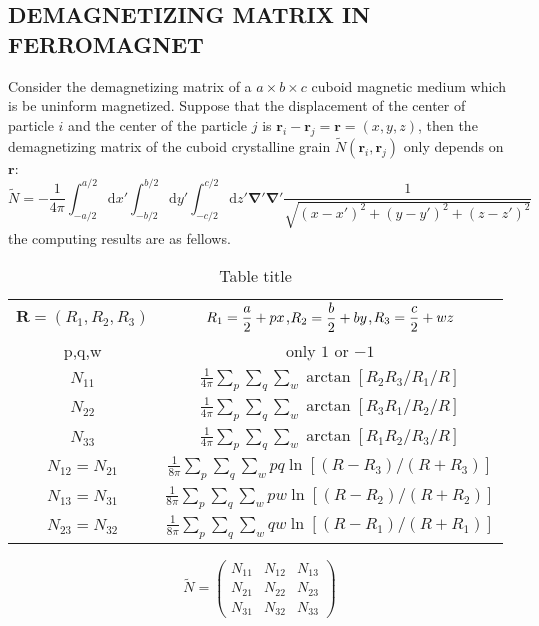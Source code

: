 \documentclass{article}
\begin{document}
\subsection{DEMAGNETIZING MATRIX IN FERROMAGNET}
Consider the demagnetizing matrix of a $a\times b\times c$ cuboid magnetic medium which is be uninform magnetized. Suppose that the displacement of the center of particle $i$ and the center of the particle $j$ is $\bm{r}_i-\bm{r}_j=\bm{r}=\left(x,y,z\right)$, then the demagnetizing matrix of the cuboid crystalline grain $\tilde{N}\left(\bm{r}_i,\bm{r}_j\right)$ only depends on $\bm{r}$: 
\begin{equation}
\tilde{N}=-\frac{1}{4\pi} \int_{-a/2}^{a/2}\mathrm{d}x'\int_{-b/2}^{b/2}\mathrm{d}y'\int_{-c/2}^{c/2}\mathrm{d}z'\bm{\nabla}'\bm{\nabla}'\frac{1}{\sqrt{\left(x-x'\right)^2+\left(y-y'\right)^2+\left(z-z'\right)^2}}\label{eq18}
\end{equation}
the computing results are as fellows.
\begin{table}[h]
	\centering
	\caption{Table title}
\begin{tabular}{cc}
	\hline $\bm{R}=\left(R_1,R_2,R_3\right)$ & $\displaystyle R_1={a\over 2}+px$,$\displaystyle R_2={b\over 2}+by$,$\displaystyle R_3={c\over 2}+wz$ \\ 
	p,q,w & only $1$ or $-1$ \\
	\hline
$N_{11}$ & $\displaystyle\frac{1}{4\pi}\sum_{p}\sum_{q}\sum_{w}\arctan\left[R_2R_3/R_1/R\right]$ \\ 
$N_{22}$ & $\displaystyle\frac{1}{4\pi}\sum_{p}\sum_{q}\sum_{w}\arctan\left[R_3R_1/R_2/R\right]$ \\ 
$N_{33}$ & $\displaystyle\frac{1}{4\pi}\sum_{p}\sum_{q}\sum_{w}\arctan\left[R_1R_2/R_3/R\right]$ \\ 
$N_{12}=N_{21}$ & $\displaystyle\frac{1}{8\pi}\sum_{p}\sum_{q}\sum_{w}pq\ln\left[\left(R-R_3\right)/\left(R+R_3\right)\right]$ \\ 
$N_{13}=N_{31}$ & $\displaystyle\frac{1}{8\pi}\sum_{p}\sum_{q}\sum_{w}pw\ln\left[\left(R-R_2\right)/\left(R+R_2\right)\right]$ \\ 
$N_{23}=N_{32}$ & $\displaystyle\frac{1}{8\pi}\sum_{p}\sum_{q}\sum_{w}qw\ln\left[\left(R-R_1\right)/\left(R+R_1\right)\right]$ \\ 
\hline 
\end{tabular} 
\end{table}
\begin{equation}
\tilde{N}=\left(\begin{array}{ccc}
N_{11} & N_{12} & N_{13} \\ 
N_{21} & N_{22} & N_{23} \\ 
N_{31} & N_{32} & N_{33}
\end{array} \right)\label{eq19}
\end{equation}
\end{document}
